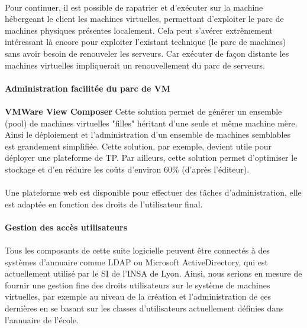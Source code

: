 \paragraph{} Pour continuer, il est possible de rapatrier et d'exécuter sur la
machine hébergeant le client les machines virtuelles, permettant d'exploiter le
parc de machines physiques présentes localement. Cela peut s'avérer extrêmement
intéressant là encore pour exploiter l'existant technique (le parc de machines)
sans avoir besoin de renouveler les serveurs. Car exécuter de façon distante les
machines virtuelles impliquerait un renouvellement du parc de serveurs.

\paragraph{Administration facilitée du parc de VM}

\paragraph{} \textbf{VMWare View Composer} Cette solution permet de générer un
ensemble (pool) de machines virtuelles "filles" héritant d'une seule et même
machine mère. Ainsi le déploiement et l'administration d'un ensemble de machines
semblables est grandement simplifiée. Cette solution, par exemple, devient utile
pour déployer une plateforme de TP. Par ailleurs, cette solution permet
d'optimiser le stockage et d'en réduire les coûts d'environ 60\% (d'après
l'éditeur).

\paragraph{} Une plateforme web est disponible pour effectuer des tâches
d'administration, elle est adaptée en fonction des droits de l'utilisateur
final.

\paragraph{Gestion des accès utilisateurs}

\paragraph{} Tous les composants de cette suite logicielle peuvent être
connectés à des systèmes d'annuaire comme LDAP ou Microsoft ActiveDirectory, qui
est actuellement utilisé par le SI de l'INSA de Lyon. Ainsi, nous serions en
mesure de fournir une gestion fine des droits utilisateurs sur le système de
machines virtuelles, par exemple au niveau de la création et l'administration de
ces dernières en se basant sur les classes d'utilisateurs actuellement définies
dans l'annuaire de l'école.

